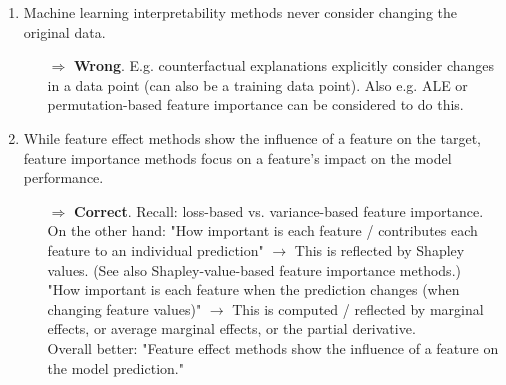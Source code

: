 \begin{enumerate}
    	\item Machine learning interpretability methods never consider changing the original data.
    	\begin{itemize}
    		\item[$\Rightarrow$] \textbf{Wrong}.
            E.g. counterfactual explanations explicitly consider changes in a data point (can also be a training data point). Also e.g. ALE or permutation-based feature importance can be considered to do this.
    	\end{itemize}

    	\item While feature effect methods show the influence of a feature on the target, feature importance methods focus on a feature's impact on the model performance.
    	\begin{itemize}
    		\item[$\Rightarrow$] \textbf{Correct}. Recall: loss-based vs. variance-based feature importance. \\
            On the other hand: "How important is each feature / contributes each feature to an individual prediction" \(\rightarrow\) This is reflected by Shapley values. (See also Shapley-value-based feature importance methods.) \\
            "How important is each feature when the prediction changes (when changing feature values)" \(\rightarrow\) This is computed / reflected by marginal effects, or average marginal effects, or the partial derivative. \\
            Overall better: "Feature effect methods show the influence of a feature on the model prediction."
    	\end{itemize}
        
    \end{enumerate}

